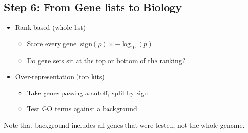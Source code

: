 \documentclass[10pt]{article}
\begin{document}
\subsection*{Step 6: From Gene lists to Biology}
\begin{itemize}
    \item Rank-based (whole list)
    \begin{itemize}
        \item Score every gene: $\text{sign}(\rho) \times -\log_{10}(p)$
        \item Do gene sets sit at the top or bottom of the ranking?
    \end{itemize}
    \item Over-representation (top hits)
    \begin{itemize}
        \item Take genes passing a cutoff, split by sign
        \item Test GO terms against a background
    \end{itemize}
\end{itemize}
Note that background includes all genes that were tested, not the whole genome.
\end{document}
